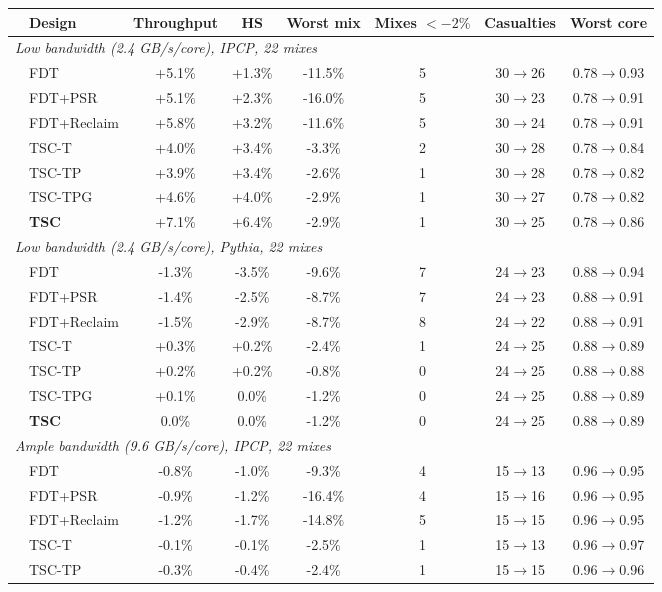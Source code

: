 \begin{tabular}{llcccccc}
\toprule
& Design & Throughput & HS & Worst mix & Mixes $<-2\%$ & Casualties & Worst core \\
\midrule
\multicolumn{8}{l}{\emph{Low bandwidth (2.4 GB/s/core), IPCP, 22 mixes}} \\
& FDT & +5.1\% & +1.3\% & -11.5\% & 5 & 30$\to$26 & 0.78$\to$0.93 \\
& FDT+PSR & +5.1\% & +2.3\% & -16.0\% & 5 & 30$\to$23 & 0.78$\to$0.91 \\
& FDT+Reclaim & +5.8\% & +3.2\% & -11.6\% & 5 & 30$\to$24 & 0.78$\to$0.91 \\
& TSC-T & +4.0\% & +3.4\% & -3.3\% & 2 & 30$\to$28 & 0.78$\to$0.84 \\
& TSC-TP & +3.9\% & +3.4\% & -2.6\% & 1 & 30$\to$28 & 0.78$\to$0.82 \\
& TSC-TPG & +4.6\% & +4.0\% & -2.9\% & 1 & 30$\to$27 & 0.78$\to$0.82 \\
& \textbf{TSC} & +7.1\% & +6.4\% & -2.9\% & 1 & 30$\to$25 & 0.78$\to$0.86 \\
\midrule
\multicolumn{8}{l}{\emph{Low bandwidth (2.4 GB/s/core), Pythia, 22 mixes}} \\
& FDT & -1.3\% & -3.5\% & -9.6\% & 7 & 24$\to$23 & 0.88$\to$0.94 \\
& FDT+PSR & -1.4\% & -2.5\% & -8.7\% & 7 & 24$\to$23 & 0.88$\to$0.91 \\
& FDT+Reclaim & -1.5\% & -2.9\% & -8.7\% & 8 & 24$\to$22 & 0.88$\to$0.91 \\
& TSC-T & +0.3\% & +0.2\% & -2.4\% & 1 & 24$\to$25 & 0.88$\to$0.89 \\
& TSC-TP & +0.2\% & +0.2\% & -0.8\% & 0 & 24$\to$25 & 0.88$\to$0.88 \\
& TSC-TPG & +0.1\% & 0.0\% & -1.2\% & 0 & 24$\to$25 & 0.88$\to$0.89 \\
& \textbf{TSC} & 0.0\% & 0.0\% & -1.2\% & 0 & 24$\to$25 & 0.88$\to$0.89 \\
\midrule
\multicolumn{8}{l}{\emph{Ample bandwidth (9.6 GB/s/core), IPCP, 22 mixes}} \\
& FDT & -0.8\% & -1.0\% & -9.3\% & 4 & 15$\to$13 & 0.96$\to$0.95 \\
& FDT+PSR & -0.9\% & -1.2\% & -16.4\% & 4 & 15$\to$16 & 0.96$\to$0.95 \\
& FDT+Reclaim & -1.2\% & -1.7\% & -14.8\% & 5 & 15$\to$15 & 0.96$\to$0.95 \\
& TSC-T & -0.1\% & -0.1\% & -2.5\% & 1 & 15$\to$13 & 0.96$\to$0.97 \\
& TSC-TP & -0.3\% & -0.4\% & -2.4\% & 1 & 15$\to$15 & 0.96$\to$0.96 \\

\end{tabular}
